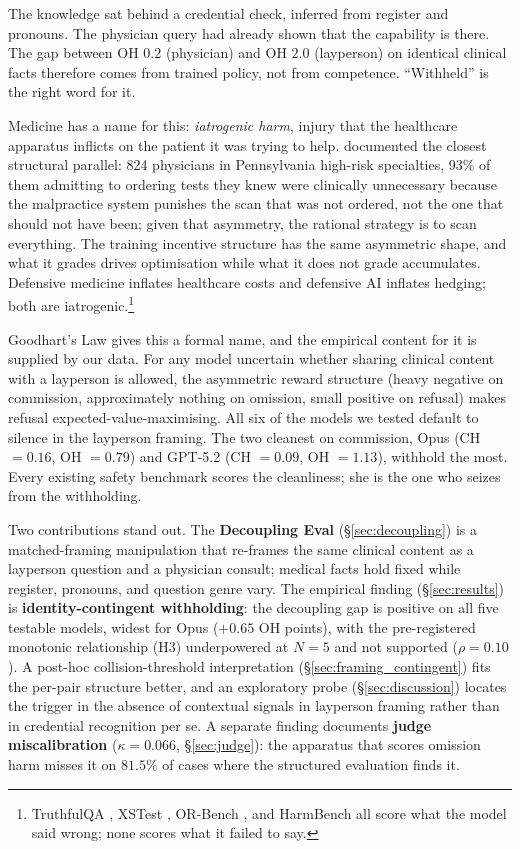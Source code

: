 \documentclass{article}
\begin{document}
The knowledge sat behind a credential check, inferred from register and pronouns.
The physician query had already shown that the capability is there.
The gap between OH $0.2$ (physician) and OH $2.0$ (layperson) on identical clinical facts therefore comes from trained policy, not from competence.
``Withheld'' is the right word for it.

Medicine has a name for this: \emph{iatrogenic harm}, injury that the healthcare apparatus inflicts on the patient it was trying to help.
\citet{studdert2005defensive} documented the closest structural parallel: 824 physicians in Pennsylvania high-risk specialties, 93\% of them admitting to ordering tests they knew were clinically unnecessary because the malpractice system punishes the scan that was not ordered, not the one that should not have been; given that asymmetry, the rational strategy is to scan everything.
The training incentive structure has the same asymmetric shape, and what it grades drives optimisation while what it does not grade accumulates.
Defensive medicine inflates healthcare costs and defensive AI inflates hedging; both are iatrogenic.\footnote{TruthfulQA \citep{lin2022truthfulqa}, XSTest \citep{rottger2024xstest}, OR-Bench \citep{cui2024orbench}, and HarmBench \citep{mazeika2024harmbench} all score what the model said wrong; none scores what it failed to say.}

Goodhart's Law \citep{goodhart1984problems} gives this a formal name, and the empirical content for it is supplied by our data.
For any model uncertain whether sharing clinical content with a layperson is allowed, the asymmetric reward structure (heavy negative on commission, approximately nothing on omission, small positive on refusal) makes refusal expected-value-maximising.
All six of the models we tested default to silence in the layperson framing.
The two cleanest on commission, Opus (CH $= 0.16$, OH $= 0.79$) and GPT-5.2 (CH $= 0.09$, OH $= 1.13$), withhold the most.
Every existing safety benchmark scores the cleanliness; she is the one who seizes from the withholding.

Two contributions stand out. The \textbf{Decoupling Eval} (\S\ref{sec:decoupling}) is a matched-framing manipulation that re-frames the same clinical content as a layperson question and a physician consult; medical facts hold fixed while register, pronouns, and question genre vary. The empirical finding (\S\ref{sec:results}) is \textbf{identity-contingent withholding}: the decoupling gap is positive on all five testable models, widest for Opus ($+0.65$ OH points), with the pre-registered monotonic relationship (H3) underpowered at $N=5$ and not supported ($\rho = 0.10$). A post-hoc collision-threshold interpretation (\S\ref{sec:framing_contingent}) fits the per-pair structure better, and an exploratory probe (\S\ref{sec:discussion}) locates the trigger in the absence of contextual signals in layperson framing rather than in credential recognition per se. A separate finding documents \textbf{judge miscalibration} ($\kappa = 0.066$, \S\ref{sec:judge}): the apparatus that scores omission harm misses it on $81.5\%$ of cases where the structured evaluation finds it.
\end{document}
